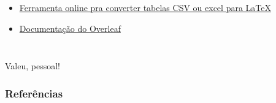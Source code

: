 \documentclass[aspectratio=169]{beamer} %
\begin{document}
\begin{frame}
\begin{columns}
        \begin{itemize}
            \item \href{https://www.tablesgenerator.com/latex\_tables}{Ferramenta
                online pra converter tabelas CSV ou excel para LaTeX}

            \item \href{https://www.overleaf.com/learn/latex/Tables}{Documentação do
                Overleaf}

        \end{itemize}

        \nocite{latexproject}
        \nocite{latex_in_y}
        \nocite{overleaf_learn_latex}


    \end{columns}


\end{frame}

\begin{frame}

    \begin{center}
        \Huge
        Valeu, pessoal!
    \end{center}

\end{frame}


\begin{frame}
    \frametitle{Referências}
    \printbibliography

\end{frame}
\end{document}
